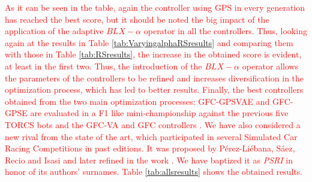 \documentclass[10pt,journal,compsoc]{IEEEtran}
\begin{document}
%
\textcolor{red}{
As it can be seen in the table, again the controller using GPS in
every generation has reached the best score, but it should be noted the
big impact of the application of the adaptive $BLX-\alpha$ operator in
all the controllers. Thus, looking again at the results in Table \ref{tab:VaryingalphaRSresults}
and comparing them with those in Table \ref{tab:RSresults}, the
increase in the obtained score is evident, at least in the first
two. %
Thus, the introduction of the $BLX-\alpha$ operator allows the parameters of the controllers to be refined and increases diversification in the optimization process, which has led to better results.
Finally, the best controllers obtained from the two main optimization
processes: {\sf GFC-GPSVAE} and {\sf GFC-GPSE} are evaluated in a F1 like
mini-championship against the previous five TORCS bots and the {\sf GFC-VA}\cite{DBLP:conf/cig/SalemMG19} and {\sf GFC} controllers  \cite{salem_cig2018}. 
We have also considered a new rival from the state of the art, which participated in several Simulated Car Racing Competitions in past editions. 
It was proposed by P{\'e}rez-Li{\'e}bana, S{\'a}ez, Recio and Isasi
\cite{EvolvingRuleSystem08} and later refined in the work
\cite{PerezEvolvingFuzzy09}. We have baptized it as \textit{PSRI} in honor of
its authors' surnames. 
Table \ref{tab:allsresults} shows the obtained results.
%
}
\end{document}
